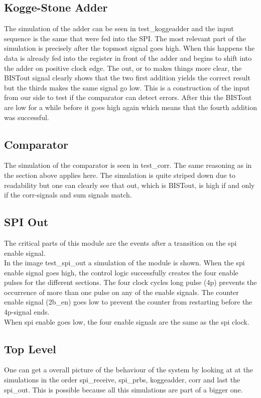 \subsection{Kogge-Stone Adder}
The simulation of the adder can be seen in test\_koggeadder and the input sequence is the same that were fed into the SPI. The most relevant part of the simulation is precisely after the topmost signal goes high. When this happens the data is already fed into the register in front of the adder and begins to shift into the adder on positive clock edge. The out, or to makes things more clear, the BISTout signal clearly shows that the two first addition yields the correct result but the thirds makes the same signal go low. This is a construction of the input from our side to test if the comparator can detect errors. After this the BISTout are low for a while before it goes high again which means that the fourth addition was successful.

\subsection{Comparator}
The simulation of the comparator is seen in test\_corr. The same reasoning as in the section above applies here. The simulation is quite striped down due to readability but one can clearly see that out, which is BISTout, is high if and only if the corr-signals and sum signals match.

\subsection{SPI Out}
The critical parts of this module are the events after a transition on the spi enable signal.\\


In the image test\_spi\_out a simulation of the module is shown. When the spi enable signal goes high, the control logic successfully creates the four enable pulses for the different sections. The four clock cycles long pulse (4p) prevents the occurrence of more than one pulse on any of the enable signals. The counter enable signal (2b\_en) goes low to prevent the counter from restarting before the 4p-signal ends. \\
When spi enable goes low, the four enable signals are the same as the spi clock.\\


\subsection{Top Level}
One can get a overall picture of the behaviour of the system by looking at at the simulations in the order spi\_receive, spi\_prbs, koggeadder, corr and last the spi\_out. This is possible because all this simulations are part of a bigger one.
